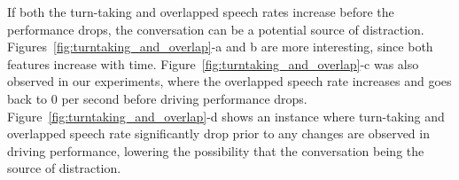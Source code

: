 If both the turn-taking and overlapped speech rates increase before the performance drops, the conversation can be a potential source of distraction. 
Figures~\ref{fig:turntaking_and_overlap}-a and b are more interesting, since both features increase with time. 
Figure~\ref{fig:turntaking_and_overlap}-c was also observed in our experiments, where the overlapped speech rate increases and goes back to $0$ per second before driving performance drops. 
Figure~\ref{fig:turntaking_and_overlap}-d shows an instance where turn-taking and overlapped speech rate significantly drop prior to any changes are observed in driving performance, lowering the possibility that the conversation being the source of distraction. 


